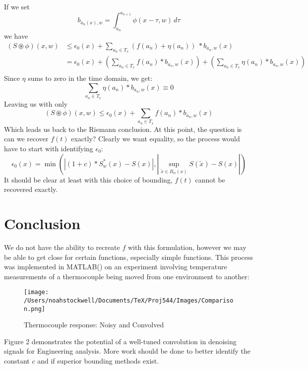 \documentclass[11pt]{amsart}
\theoremstyle{definition}
\theoremstyle{remark}
\begin{document}
If we set 
\[
b_{{a_n}(x), w} = \int_{a_n}^{a_{n+1}} \phi(x-\tau, w)\,d\tau
\]
we have
\begin{align*}
(S\circledast\phi)(x, w) &\le \epsilon_0(x) +  \sum_{a_n\in T_x} \left(f\left(a_n\right) + \eta\left(a_n\right)\right)\ * b_{{a_n}, w}(x)\\
&= \epsilon_0(x) +  \left(\sum_{a_n\in T_x} f\left(a_n\right) * b_{{a_n}, w}(x)\right) + \left(\sum_{a_n\in T_x} \eta\left(a_n\right) * b_{{a_n}, w}(x)\right)\\
\end{align*}
Since $\eta$ sums to zero in the time domain, we get:
\[
\sum_{a_n\in T_x} \eta\left(a_n\right) * b_{{a_n}, w}(x) \equiv 0
\]
Leaving us with only
\[
(S\circledast\phi)(x, w) \le \epsilon_0(x) +  \sum_{a_n\in T_x} f\left(a_n\right) * b_{{a_n}, w}(x)
\]
Which leads us back to the Riemann conclusion. At this point, the question is can we recover $f(t)$ exactly? Clearly we want equality, so the process would have to start with identifying $\epsilon_0$:
\[
\epsilon_0(x) = \min\left(\left|(1+c)*S^*_{w}(x) - S(x)\right|, \left|\sup_{\tilde{x}\in B_w(x)}S(\tilde{x}) - S(x)\right|\right)
\]
It should be clear at least with this choice of bounding, $f(t)$ cannot be recovered exactly.
\newpage
\section{Conclusion}
We do not have the ability to recreate $f$ with this formulation, however we may be able to get close for certain functions, especially simple functions. This process was implemented in MATLAB(\texttrademark) on an experiment involving temperature measurements of a thermocouple being moved from one environment to another:
\begin{figure}[H]
	\centering
	\texttt{[image: /Users/noahstockwell/Documents/TeX/Proj544/Images/Comparison.png]}
	\caption{Thermocouple response: Noisy and Convolved}
\end{figure}
Figure 2 demonstrates the potential of a well-tuned convolution in denoising signals for Engineering analysis. More work should be done to better identify the constant $c$ and if superior bounding methods exist.
\newpage


\end{document}

